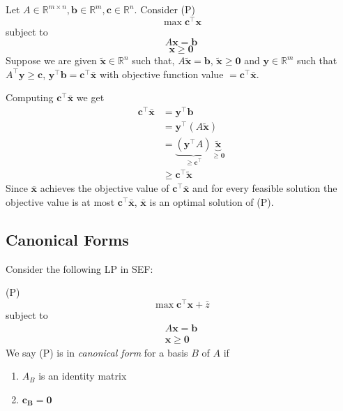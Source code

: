 Let $A\in \mathbb{R}^{m\times n}, \bm{b}\in\mathbb{R}^m, \bm{c}\in\mathbb{R}^n$.
Consider (P)
\[\max \bm{c}^\top \bm{x}\]
subject to
\[ A\bm{x}=\bm{b} \]
\[ \bm{x}\geqslant \bm{0} \]
Suppose we are given
$\bm{\tilde{x}}\in\mathbb{R}^n$ such that, $A\bm{\tilde{x}}=\bm{b}$,
$\bm{\tilde{x}}\geqslant \bm{0}$
and
$\bm{y}\in\mathbb{R}^m$ such that $A^\top \bm{y}\geqslant \bm{c}$,
$\bm{y}^\top \bm{b}=\bm{c}^\top \bm{\bar{x}}$ with objective function
value $=\bm{c}^\top \bm{\bar{x}}$.


Computing $\bm{c}^\top \bm{\bar{x}}$ we get
\begin{align*}
    \bm{c}^\top \bm{\bar{x}} & =\bm{y}^\top \bm{b}                   \\
                             & =\bm{y}^\top (A\bm{\tilde{x}})        \\
                             & =
    \underbrace{(\bm{y}^\top A)}_{\geqslant  \bm{c}^\top }
    \underbrace{\bm{\tilde{x}}}_{\geqslant  \bm{0}}                  \\
                             & \geqslant  \bm{c}^\top \bm{\tilde{x}}
\end{align*}
Since $\bm{\bar{x}}$ achieves the objective value of
$\bm{c}^\top \bm{\bar{x}}$ and for every feasible solution the objective
value is at most $\bm{c}^\top \bm{\bar{x}}$, $\bm{\bar{x}}$ is an
optimal solution of (P).

\subsection{Canonical Forms}
\begin{defbox}
    \begin{definition}
        Consider the following LP in SEF:

        (P)
        \[\max \bm{c}^\top  \bm{x}+\bar{z}\]
        subject to
        \begin{align*}
            A\bm{x}=\bm{b} \\
            \bm{x}\geqslant  \bm{0}
        \end{align*}
        We say (P) is in \emph{canonical form} for a basis $B$ of $A$ if
        \begin{enumerate}[(C1)]
            \item $A_B$ is an identity matrix
            \item $\bm{c_B}=\bm{0}$
        \end{enumerate}
    \end{definition}
\end{defbox}

